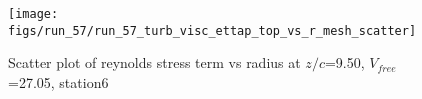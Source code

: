 \begin{figure}[H]
\centering
\texttt{[image: figs/run\_57/run\_57\_turb\_visc\_ettap\_top\_vs\_r\_mesh\_scatter]}
\caption{Scatter plot of reynolds stress term vs radius at $z/c$=9.50, $V_{free}$=27.05, station6}
\label{fig:run_57_turb_visc_ettap_top_vs_r_mesh_scatter}
\end{figure}


